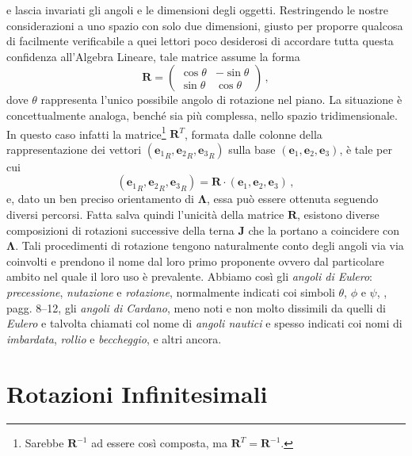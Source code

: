 e lascia invariati gli angoli e le dimensioni degli oggetti.
Restringendo le nostre considerazioni a uno spazio con solo due 
dimensioni, giusto per proporre qualcosa di facilmente verificabile
 a quei lettori
poco desiderosi di accordare tutta questa confidenza all'Algebra Lineare,
tale matrice assume la forma
\begin{equation}
{\bm R}=\left( \begin{array}{cc}
\cos \theta & -\sin \theta\\ 
\sin \theta & \cos \theta
\end{array}
\right)
\,,
\label{e15_app11}
\end{equation}
 \noindent dove
$\theta$ rappresenta l'unico possibile angolo di rotazione nel piano.
\noindent La situazione \`e concettualmente analoga, bench\'e 
sia pi\`u complessa, nello spazio
tridimensionale. 
In questo caso infatti la matrice\footnote{
Sarebbe ${\bm R}^{-1}$ ad essere cos\`i composta, ma
${\bm R}^T={\bm R}^{-1}$.
}
${\bm{R}}^T$,
formata dalle colonne della
rappresentazione dei vettori $\left({{\bm e}_1}_{R},{{\bm e}_2}_{R},
{{\bm e}_3}_{R}\right)$ sulla base $\left(\bm{e}_1, \bm{e}_2, \bm{e}_3\right)$,
\`e tale per cui
\begin{equation}
({{\bm e}_1}_{R},{{\bm e}_2}_{R}, {{\bm e}_3}_{R})
= {\bm R}\cdot
(\bm{e}_1, \bm{e}_2, \bm{e}_3)
\,,
\label{eq:rot}
\end{equation}
\noindent e, dato un ben preciso orientamento di ${\bm \Lambda}$,
essa pu\`o essere ottenuta seguendo diversi percorsi.
Fatta salva quindi l'unicit\`a della matrice $\bm R$, esistono diverse
composizioni di rotazioni successive della terna $\bm J$ che la portano
a coincidere con $\bm \Lambda$. Tali procedimenti di rotazione
tengono naturalmente conto degli angoli via via coinvolti e prendono
il nome dal loro primo proponente ovvero dal particolare ambito nel quale il
loro uso \`e prevalente.
Abbiamo cos\`i gli {\em angoli di Eulero}: {\em
precessione}, {\em nutazione} e 
{\em rotazione}, normalmente indicati coi simboli
$\theta$, $\phi$  e $\psi$,
\cite{whittaker}, pagg. 8--12, gli {\em angoli di Cardano}, meno noti e non molto dissimili da quelli di {\em Eulero} e talvolta
chiamati col nome di {\em angoli nautici} e
spesso indicati coi nomi
di {\em imbardata}, {\em rollio} e 
{\em beccheggio}, e altri ancora.

\section{Rotazioni Infinitesimali}


